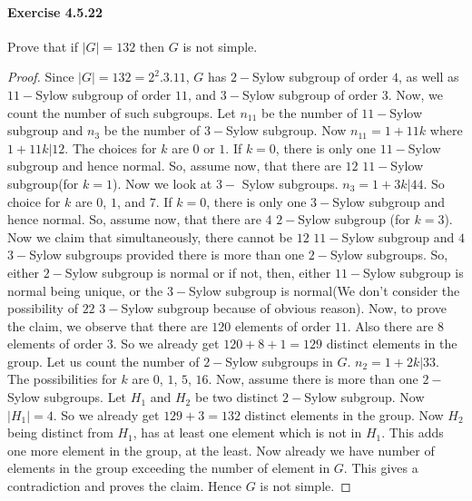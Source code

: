 \documentclass{article}
\theoremstyle{definition}
\begin{document}
\paragraph{Exercise 4.5.22} Prove that if $|G|=132$ then $G$ is not simple.
\begin{proof}    
Since $|G|=132=2^{2}.3.11$, $G$ has $2-$Sylow subgroup of order $4$, as well as $11-$Sylow subgroup of order $11$, and $3-$Sylow subgroup of order $3$. Now, we count the number of such subgroups. Let $n_{11}$ be the number of  $11-$Sylow subgroup and $n_{3}$ be the number of  $3-$Sylow subgroup. Now $n_{11}=1+11k$ where $1+11k|12$. The choices for $k$ are $0$ or $1$. If $k=0$, there is only one $11-$Sylow subgroup and hence normal. So, assume now, that there are $12$ $11-$Sylow subgroup(for $k=1$). Now we look at $3-$ Sylow subgroups. $n_{3}=1+3k| 44$. So choice for $k$ are $0$, $1$, and $7$. If $k=0$, there is only one $3-$Sylow subgroup and hence normal. So, assume now, that there are $4$ $2-$Sylow subgroup (for $k=3$). Now we claim that simultaneously, there cannot be $12$ $11-$Sylow subgroup and $4$ $3-$Sylow subgroups provided there is more than one $2-$Sylow subgroups. So, either $2-$Sylow subgroup is normal or if not, then, either $11-$Sylow subgroup is normal being unique, or  the $3-$Sylow subgroup is normal(We don't consider the possibility of $22$ $3-$Sylow subgroup because of obvious reason). Now, to prove the claim, we observe that there are $120$ elements of order $11$. Also there are $8$ elements of order $3$. So we already get $120+8+1=129$ distinct elements in the group. Let us count the number of $2-$Sylow subgroups in $G$. $n_{2}=1+2k|33$. The possibilities for $k$ are $0$, $1$, $5$, $16$. Now, assume there is more than one $2-$Sylow subgroups. Let $H_{1}$ and $H_{2}$ be two distinct  $2-$Sylow subgroup. Now $|H_{1}|=4$. So we already get $129+3=132$ distinct elements in the group. Now $H_{2}$ being distinct from $H_{1}$, has at least one element which is not in $H_{1}$. This adds one more element in the group, at the least. Now already we have number of elements in the group exceeding the number of element in $G$. This gives a contradiction and proves the claim.
Hence $G$ is not simple.
\end{proof}
\end{document}
